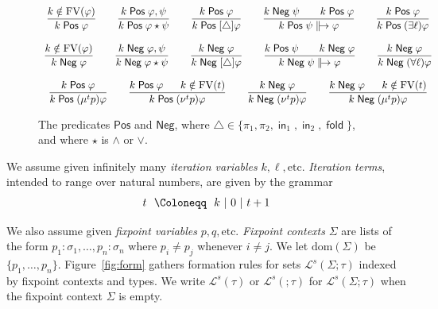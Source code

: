 \documentclass[%
  a4paper,
  UKenglish,
  cleveref,
  autoref,
  thm-restate,
  numberwithinsect,
]{lipics-v2021}
\newcommand\bnf\Coloneqq
\newcommand\gss{~|~}
\newcommand\dom{\mathrm{dom}}
\newcommand\FV{\mathrm{FV}}
\newcommand\term[1]{\mathsf{#1}}
\newcommand\inj{\mathop{\term{in}}}
\newcommand\fold{\mathop{\term{fold}}}
\newcommand\defrealto{\mathrel\parallel\joinrel\to}
\newcommand\realto{\mathrel{\defrealto}}
\newcommand\PT{\tau}		%
\newcommand\PTbis{\sigma}	%
\newcommand\itvar{k}
\newcommand\itvarbis{\ell}
\newcommand\Pos{\mathrel{\term{Pos}}}
\newcommand\Neg{\mathrel{\term{Neg}}}
\newcommand\FP{p}
\newcommand\FPbis{q}
\newcommand\FPEnv{\Sigma}
\newcommand\finmu{\mu}
\newcommand\finnu{\nu}
\newcommand\Lang{\mathcal{L}}
\newcommand\form[1]{\lbrack #1 \rbrack}
\newcommand\modgen{\mathord{\triangle}}	%
\newcommand\sign{s}
\begin{document}
\begin{figure}[t!]
\centering
\(
\begin{array}{c}
%
\dfrac{\itvar \notin \FV(\varphi)}
  {\itvar \Pos \varphi}
%
\qquad
%
\dfrac{\itvar \Pos \varphi, \psi}
  {\itvar \Pos \varphi \star \psi}
%
\qquad
%
\dfrac{\itvar \Pos \varphi}
  {\itvar \Pos \form\modgen \varphi}
%
\qquad
%
\dfrac{\itvar \Neg \psi
  \qquad
  \itvar \Pos \varphi}
  {\itvar \Pos \psi \realto \varphi}
%
\qquad
%
\dfrac{\itvar \Pos \varphi}
  {\itvar \Pos (\exists \itvarbis)\varphi}
%
\\\\
%
\dfrac{\itvar \notin \FV(\varphi)}
  {\itvar \Neg \varphi}
%
\qquad
%
\dfrac{\itvar \Neg \varphi, \psi}
  {\itvar \Neg \varphi \star \psi}
%
\qquad
%
\dfrac{\itvar \Neg \varphi}
  {\itvar \Neg \form\modgen \varphi}
%
\qquad
%
\dfrac{\itvar \Pos \psi
  \qquad
  \itvar \Neg \varphi}
  {\itvar \Neg \psi \realto \varphi}
%
\qquad
%
\dfrac{\itvar \Neg \varphi}
  {\itvar \Neg (\forall \itvarbis)\varphi}
%
\\\\
%
\dfrac{\itvar \Pos \varphi}
  {\itvar \Pos (\finmu^t \FP)\varphi}
%
\qquad
%
\dfrac{\itvar \Pos \varphi
  \quad~~
  \itvar \notin \FV(t)}
  {\itvar \Pos (\finnu^t \FP)\varphi}
%
\qquad
%
\dfrac{\itvar \Neg \varphi}
  {\itvar \Neg (\finnu^t \FP)\varphi}
%
\qquad
%
\dfrac{\itvar \Neg \varphi
  \quad~~
  \itvar \notin \FV(t)}
  {\itvar \Neg (\finmu^t \FP)\varphi}
%
\end{array}
\)
\caption{The predicates $\Pos$ and $\Neg$,
where $\modgen \in \{\pi_1,\pi_2, \inj_1, \inj_2, \fold\}$,
and where $\star$ is $\land$ or $\lor$.%
\label{fig:posneg}}
\end{figure}




We assume given infinitely many \emph{iteration variables}
$\itvar, \itvarbis, \text{etc}$.
\emph{Iteration terms},
intended to range over natural numbers,
are given by the grammar
\[
\begin{array}{r @{~~} c @{~~} l}
     t
&    \bnf
&    \itvar
\gss 0
\gss t+1
\end{array}
\]

We also assume given \emph{fixpoint variables}
$\FP, \FPbis, \text{etc}$.
\emph{Fixpoint contexts} $\FPEnv$ are
lists of the form
$\FP_1\colon \PTbis_1,\dots,\FP_n \colon \PTbis_n$
where $\FP_i \neq \FP_j$ whenever $i \neq j$.
We let $\dom(\FPEnv)$ be $\{\FP_1,\dots,\FP_n\}$.
%
Figure~\ref{fig:form} gathers formation rules for sets $\Lang^\sign(\FPEnv;\PT)$
indexed by fixpoint contexts and types.
We write $\Lang^\sign(\PT)$ or $\Lang^\sign(;\PT)$ 
for $\Lang^\sign(\FPEnv;\PT)$
when the fixpoint context $\FPEnv$ is empty.
\end{document}
